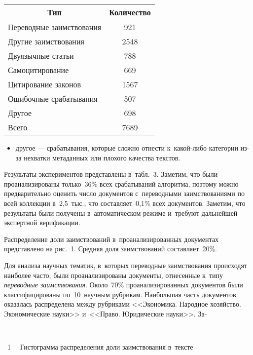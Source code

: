 \begin{multicols}{2}
\begin{center}
{\small 
\tabcolsep=10pt
\begin{tabular}{|l|c|}
  \hline
 \multicolumn{1}{|c|}{\bf Тип} & \bf Количество  \\
  \hline
Переводные заимствования & 921 \\ 
Другие заимствования & 2548\hphantom{9} \\ 
Двуязычные статьи & 788 \\ 
Самоцитирование & 669 \\ 
Цитирование законов & 1567\hphantom{9} \\ 
Ошибочные срабатывания & 507 \\ 
Другое & 698 \\ 
\hline 
Всего & 7689\hphantom{9} \\ 
\hline
\end{tabular}
}
\end{center}



\begin{itemize}
\item другое --- срабатывания, которые сложно отнести к~ка\-кой-ли\-бо категории из-за 
нехватки метаданных или плохого качества текстов.
\end{itemize}

Результаты экспериментов представлены в~табл.~3. Заметим, что были 
проанализированы только~36\% всех срабатываний алгоритма, поэтому можно 
предварительно оценить число документов с~переводными заимствованиями по всей 
коллекции в~2,5~тыс., что составляет~0,1\% всех документов. 
Заметим, что результаты были получены в~автоматическом режиме и~требуют 
дальнейшей экспертной верификации.




Распределение доли заимствований в~проанализированных документах 
представлено на рис.~1. Средняя доля заимствований со\-став\-ля\-ет~20\%.

Для анализа научных тематик, в~которых переводные заимствования происходят 
наиболее час\-то, были проанализированы документы, отнесенные к~типу 
\textit{переводные заимствования}.
Около~70\% проанализированных документов были классифицированы по~10~научным 
рубрикам. Наибольшая часть
 документов оказалась распределена между руб\-ри\-ка\-ми 
<<Экономика. Народное хозяйство. Экономические науки>> и~<<Право. Юридические 
науки>>. За-\linebreak\vspace*{-12pt}

{ \begin{center}  %
 \vspace*{9pt}
    \mbox{%
\epsfxsize=79mm
}

\end{center}

\noindent
{{\figurename~1}\ \ \small{
Гистограмма распределения доли заимствования в~тексте
}}}

\pagebreak

\end{multicols}

